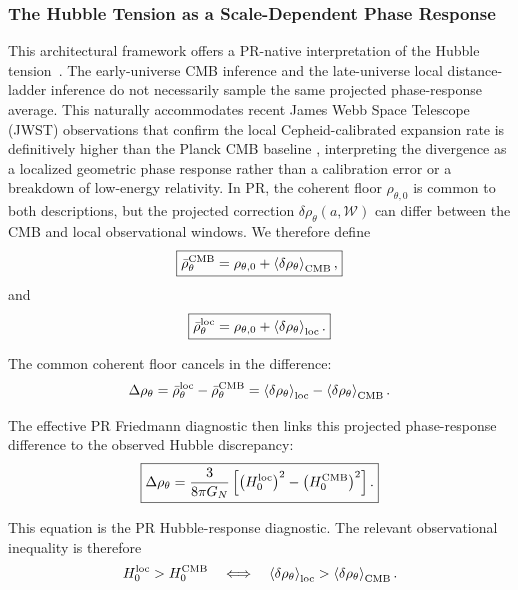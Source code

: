 \documentclass[11pt]{article}
\begin{document}
\subsubsection{The Hubble Tension as a Scale-Dependent Phase Response}

This architectural framework offers a PR-native interpretation of the Hubble tension~\cite{DiValentino2021}. The early-universe CMB inference and the late-universe local distance-ladder inference do not necessarily sample the same projected phase-response average. This naturally accommodates recent James Webb Space Telescope (JWST) observations \cite{Riess2024JWST} that confirm the local Cepheid-calibrated expansion rate is definitively higher than the Planck CMB baseline \cite{planck2020}, interpreting the divergence as a localized geometric phase response rather than a calibration error or a breakdown of low-energy relativity. In PR, the coherent floor \(\rho_{\theta,0}\) is common to both descriptions, but the projected correction \(\delta\rho_\theta(a,\mathcal W)\) can differ between the CMB and local observational windows. We therefore define
\begin{equation}
\boxed{
\bar\rho_{\theta}^{\rm CMB}
=
\rho_{\theta,0}
+
\left\langle
\delta\rho_\theta
\right\rangle_{\rm CMB},
}
\end{equation}
and
\begin{equation}
\boxed{
\bar\rho_{\theta}^{\rm loc}
=
\rho_{\theta,0}
+
\left\langle
\delta\rho_\theta
\right\rangle_{\rm loc}.
}
\end{equation}

The common coherent floor cancels in the difference:
\begin{equation}
\Delta\rho_\theta
=
\bar\rho_{\theta}^{\rm loc}
-
\bar\rho_{\theta}^{\rm CMB}
=
\left\langle
\delta\rho_\theta
\right\rangle_{\rm loc}
-
\left\langle
\delta\rho_\theta
\right\rangle_{\rm CMB}.
\end{equation}

The effective PR Friedmann \cite{Friedmann1922} diagnostic then links this projected phase-response difference to the observed Hubble discrepancy:
\begin{equation}
\boxed{
\Delta\rho_\theta
=
\frac{3}{8\pi G_N}
\left[
\left(
H_0^{\rm loc}
\right)^2
-
\left(
H_0^{\rm CMB}
\right)^2
\right].
}
\end{equation}

This equation is the PR Hubble-response diagnostic. The relevant observational inequality is therefore
\begin{equation}
H_0^{\rm loc} > H_0^{\rm CMB}
\quad
\Longleftrightarrow
\quad
\left\langle
\delta\rho_\theta
\right\rangle_{\rm loc}
>
\left\langle
\delta\rho_\theta
\right\rangle_{\rm CMB}.
\end{equation}
\end{document}
